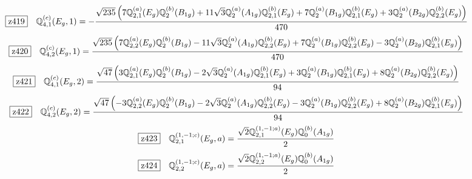 \documentclass[fleqn,10pt,landscape]{jsarticle}
\begin{document}
\begin{dmath*}
\hspace*{3mm}\fbox{z419}\quad \mathbb{Q}_{4,1}^{(c)}(E_{g},1)=- \frac{\sqrt{235} \left(7 \mathbb{Q}_{2,1}^{(a)}(E_{g}) \mathbb{Q}_{2}^{(b)}(B_{1g}) + 11 \sqrt{3} \mathbb{Q}_{2}^{(a)}(A_{1g}) \mathbb{Q}_{2,1}^{(b)}(E_{g}) + 7 \mathbb{Q}_{2}^{(a)}(B_{1g}) \mathbb{Q}_{2,1}^{(b)}(E_{g}) + 3 \mathbb{Q}_{2}^{(a)}(B_{2g}) \mathbb{Q}_{2,2}^{(b)}(E_{g})\right)}{470}
\end{dmath*}
\begin{dmath*}
\hspace*{3mm}\fbox{z420}\quad \mathbb{Q}_{4,2}^{(c)}(E_{g},1)=\frac{\sqrt{235} \left(7 \mathbb{Q}_{2,2}^{(a)}(E_{g}) \mathbb{Q}_{2}^{(b)}(B_{1g}) - 11 \sqrt{3} \mathbb{Q}_{2}^{(a)}(A_{1g}) \mathbb{Q}_{2,2}^{(b)}(E_{g}) + 7 \mathbb{Q}_{2}^{(a)}(B_{1g}) \mathbb{Q}_{2,2}^{(b)}(E_{g}) - 3 \mathbb{Q}_{2}^{(a)}(B_{2g}) \mathbb{Q}_{2,1}^{(b)}(E_{g})\right)}{470}
\end{dmath*}
\begin{dmath*}
\hspace*{3mm}\fbox{z421}\quad \mathbb{Q}_{4,1}^{(c)}(E_{g},2)=\frac{\sqrt{47} \left(3 \mathbb{Q}_{2,1}^{(a)}(E_{g}) \mathbb{Q}_{2}^{(b)}(B_{1g}) - 2 \sqrt{3} \mathbb{Q}_{2}^{(a)}(A_{1g}) \mathbb{Q}_{2,1}^{(b)}(E_{g}) + 3 \mathbb{Q}_{2}^{(a)}(B_{1g}) \mathbb{Q}_{2,1}^{(b)}(E_{g}) + 8 \mathbb{Q}_{2}^{(a)}(B_{2g}) \mathbb{Q}_{2,2}^{(b)}(E_{g})\right)}{94}
\end{dmath*}
\begin{dmath*}
\hspace*{3mm}\fbox{z422}\quad \mathbb{Q}_{4,2}^{(c)}(E_{g},2)=\frac{\sqrt{47} \left(- 3 \mathbb{Q}_{2,2}^{(a)}(E_{g}) \mathbb{Q}_{2}^{(b)}(B_{1g}) - 2 \sqrt{3} \mathbb{Q}_{2}^{(a)}(A_{1g}) \mathbb{Q}_{2,2}^{(b)}(E_{g}) - 3 \mathbb{Q}_{2}^{(a)}(B_{1g}) \mathbb{Q}_{2,2}^{(b)}(E_{g}) + 8 \mathbb{Q}_{2}^{(a)}(B_{2g}) \mathbb{Q}_{2,1}^{(b)}(E_{g})\right)}{94}
\end{dmath*}
\begin{dmath*}
\hspace*{3mm}\fbox{z423}\quad \mathbb{Q}_{2,1}^{(1,-1;c)}(E_{g},a)=\frac{\sqrt{2} \mathbb{Q}_{2,1}^{(1,-1;a)}(E_{g}) \mathbb{Q}_{0}^{(b)}(A_{1g})}{2}
\end{dmath*}
\begin{dmath*}
\hspace*{3mm}\fbox{z424}\quad \mathbb{Q}_{2,2}^{(1,-1;c)}(E_{g},a)=\frac{\sqrt{2} \mathbb{Q}_{2,2}^{(1,-1;a)}(E_{g}) \mathbb{Q}_{0}^{(b)}(A_{1g})}{2}
\end{dmath*}
\end{document}
